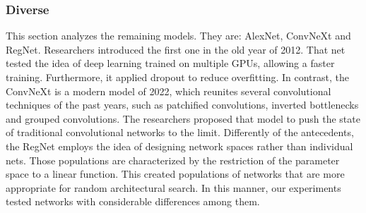 




\FloatBarrier


\subsubsection{Diverse}

This section analyzes the remaining models. They are: AlexNet, ConvNeXt and RegNet. Researchers introduced the first one in the old year of 2012. That net tested the idea of deep learning trained on multiple GPUs, allowing a faster training. Furthermore, it applied dropout to reduce overfitting. In contrast, the ConvNeXt is a modern model of 2022, which reunites several convolutional techniques of the past years, such as patchified convolutions, inverted bottlenecks and grouped convolutions. The researchers proposed that model to push the state of traditional convolutional networks to the limit. Differently of the antecedents, the RegNet employs the idea of designing network spaces rather than individual nets. Those populations are characterized by the restriction of the parameter space to a linear function. This created populations of networks that are more appropriate for random architectural search. In this manner, our experiments tested networks with considerable differences among them.

